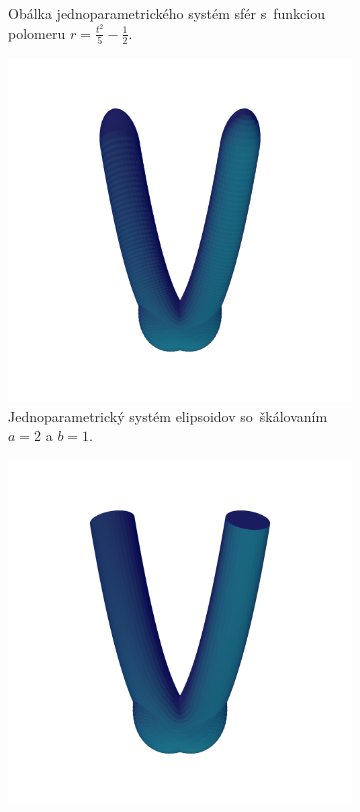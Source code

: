 \begin{figure}[h]
\begin{subfigure}[t]{0.49\textwidth}
        	\caption{Obálka jednoparametrického systém sfér s~funkciou polomeru $r=\frac{t^2}{5}-\frac{1}{2}$.}
        \label{fig:plocha4}
    \end{subfigure}
    \begin{subfigure}[t]{0.49\textwidth}
        \centering
        \includegraphics[width=\textwidth, trim=0mm 50mm 0mm 50mm, clip=true]{images/bienert_ellipsoids.png}
		\caption{Jednoparametrický systém elipsoidov so~škálovaním $a=2$ a $b=1$.}
        \label{fig:plocha5}
    \end{subfigure}
    \hfill
    \begin{subfigure}[t]{0.49\textwidth}
        \centering
        \includegraphics[width=\textwidth, trim=0mm 50mm 0mm 50mm, clip=true]{images/bienert_ellipsoids_envelope.png}

\end{subfigure}
\end{figure}
